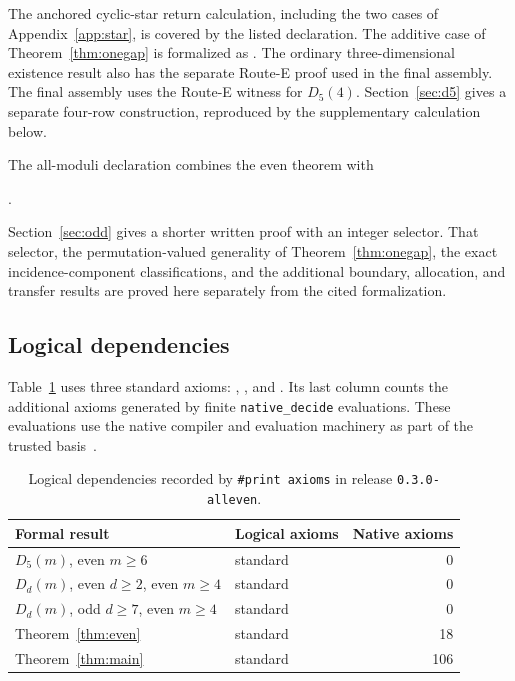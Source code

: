 \documentclass[11pt,reqno]{amsart}
\numberwithin{equation}{section}
\theoremstyle{definition}
\theoremstyle{remark}
\begin{document}
The anchored cyclic-star return calculation, including the two cases of
Appendix~\ref{app:star}, is covered by the listed declaration. The additive
case of Theorem~\ref{thm:onegap} is formalized as
. The ordinary three-dimensional existence
result also has the separate Route-E proof used in the final assembly.
The final assembly uses the Route-E witness for $D_5(4)$.
Section~\ref{sec:d5} gives a separate four-row construction, reproduced
by the supplementary calculation below.

The all-moduli declaration combines the even theorem with
\begin{center}\small
{}.
\end{center}
Section~\ref{sec:odd} gives a shorter written proof with an integer
selector. That selector, the permutation-valued generality of
Theorem~\ref{thm:onegap}, the exact incidence-component classifications,
and the additional boundary, allocation, and transfer results are
proved here separately from the cited formalization.

\subsection{Logical dependencies}
Table~\ref{tab:formal-audit} uses three standard axioms:
, , and .
Its last column counts the additional axioms generated by finite
\texttt{native\_decide} evaluations. These evaluations use the native
compiler and evaluation machinery as part of the trusted basis~\cite{LeanReference}.

\begin{table}[htbp]
\centering\small
\begin{tabular}{@{}p{}p{}r@{}}
\toprule
Formal result & Logical axioms & Native axioms\\
\midrule
$D_5(m)$, even $m\ge6$ & standard & 0\\
$D_d(m)$, even $d\ge2$, even $m\ge4$ & standard & 0\\
$D_d(m)$, odd $d\ge7$, even $m\ge4$ & standard & 0\\
Theorem~\ref{thm:even} & standard & 18\\
Theorem~\ref{thm:main} & standard & 106\\
\bottomrule
\end{tabular}
\caption{Logical dependencies recorded by \texttt{\#print axioms} in
release \texttt{0.3.0-alleven}.}\label{tab:formal-audit}
\end{table}
\end{document}
